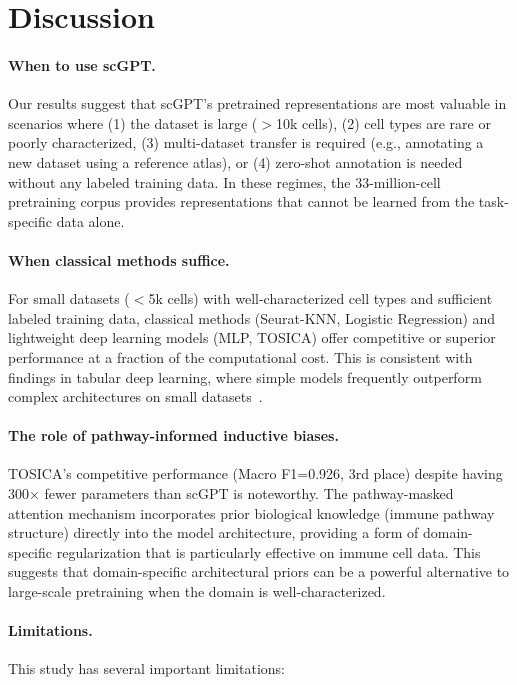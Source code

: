 \documentclass{article}
\begin{document}
\section{Discussion}
\label{sec:discussion}

\paragraph{When to use scGPT.}
Our results suggest that scGPT's pretrained representations are most valuable in scenarios
where (1) the dataset is large ($>$10k cells), (2) cell types are rare or poorly
characterized, (3) multi-dataset transfer is required (e.g., annotating a new dataset
using a reference atlas), or (4) zero-shot annotation is needed without any labeled
training data. In these regimes, the 33-million-cell pretraining corpus provides
representations that cannot be learned from the task-specific data alone.

\paragraph{When classical methods suffice.}
For small datasets ($<$5k cells) with well-characterized cell types and sufficient labeled
training data, classical methods (Seurat-KNN, Logistic Regression) and lightweight deep
learning models (MLP, TOSICA) offer competitive or superior performance at a fraction of
the computational cost. This is consistent with findings in tabular deep learning, where
simple models frequently outperform complex architectures on small datasets~\citep{grinsztajn2022tree}.

\paragraph{The role of pathway-informed inductive biases.}
TOSICA's competitive performance (Macro F1=0.926, 3rd place) despite having 300$\times$
fewer parameters than scGPT is noteworthy. The pathway-masked attention mechanism
incorporates prior biological knowledge (immune pathway structure) directly into the
model architecture, providing a form of domain-specific regularization that is
particularly effective on immune cell data. This suggests that domain-specific
architectural priors can be a powerful alternative to large-scale pretraining when
the domain is well-characterized.

\paragraph{Limitations.}
This study has several important limitations:
\end{document}
